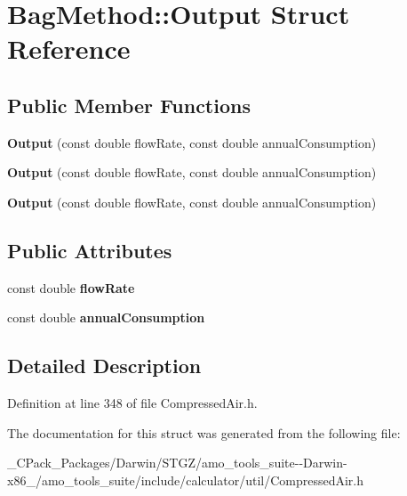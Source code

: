 \hypertarget{struct_bag_method_1_1_output}{}\section{Bag\+Method\+:\+:Output Struct Reference}
\label{struct_bag_method_1_1_output}
\subsection*{Public Member Functions}
\begin{DoxyCompactItemize}
\item 
\mbox{\label{struct_bag_method_1_1_output_a32476edc4a2b924580f0976732cb9aa0}} 
{\bfseries Output} (const double flow\+Rate, const double annual\+Consumption)
\item 
\mbox{\label{struct_bag_method_1_1_output_a32476edc4a2b924580f0976732cb9aa0}} 
{\bfseries Output} (const double flow\+Rate, const double annual\+Consumption)
\item 
\mbox{\label{struct_bag_method_1_1_output_a32476edc4a2b924580f0976732cb9aa0}} 
{\bfseries Output} (const double flow\+Rate, const double annual\+Consumption)
\end{DoxyCompactItemize}
\subsection*{Public Attributes}
\begin{DoxyCompactItemize}
\item 
\mbox{\label{struct_bag_method_1_1_output_a6625c932cfa3935a7198b8ed1747955f}} 
const double {\bfseries flow\+Rate}
\item 
\mbox{\label{struct_bag_method_1_1_output_ae287da01450815f1cc6d22b39944482a}} 
const double {\bfseries annual\+Consumption}
\end{DoxyCompactItemize}


\subsection{Detailed Description}


Definition at line 348 of file Compressed\+Air.\+h.



The documentation for this struct was generated from the following file\+:\begin{DoxyCompactItemize}
\item 
\+\_\+\+C\+Pack\+\_\+\+Packages/\+Darwin/\+S\+T\+G\+Z/amo\+\_\+tools\+\_\+suite-\/-\/\+Darwin-\/x86\+\_/amo\+\_\+tools\+\_\+suite/include/calculator/util/Compressed\+Air.\+h\end{DoxyCompactItemize}
